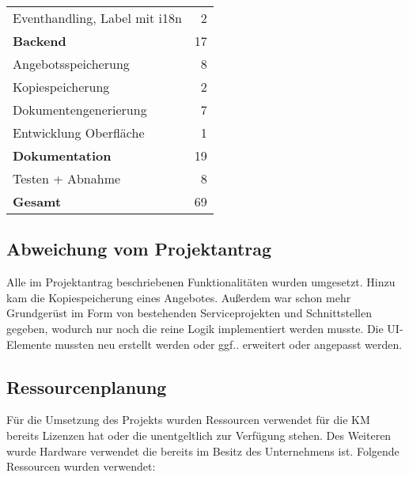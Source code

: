 {\begin{tabular}{|l|r|}
	Eventhandling, Label mit i18n                            &                        2 \\
	\textbf{Backend  }                                       &                       17 \\
	Angebotsspeicherung                                       &                        8 \\
	Kopiespeicherung                                         &                        2 \\
	Dokumentengenerierung                                    &                        7 \\
	Entwicklung Oberfläche                                   &                        1 \\
	\textbf{Dokumentation }                                  &                       19 \\
	Testen + Abnahme                                         &                        8 \\ \hline
	\textbf{	Gesamt    }                                  &                       69 \\ \hline
\end{tabular}


\subsection{Abweichung vom Projektantrag}
\label{abweichung}
Alle im Projektantrag beschriebenen Funktionalitäten wurden umgesetzt. Hinzu kam die Kopiespeicherung eines Angebotes. Außerdem war schon mehr Grundgerüst im Form von bestehenden Serviceprojekten und Schnittstellen gegeben, wodurch nur noch die reine Logik implementiert werden musste. Die UI-Elemente mussten neu erstellt werden oder ggf.. erweitert oder angepasst werden.
\subsection{Ressourcenplanung}
\label{ressourcenplanung}
Für die Umsetzung des Projekts wurden Ressourcen verwendet für die \ac{KM} bereits Lizenzen hat oder die unentgeltlich zur Verfügung stehen. Des Weiteren wurde Hardware verwendet die bereits im Besitz des Unternehmens ist.
Folgende Ressourcen wurden verwendet:

}
